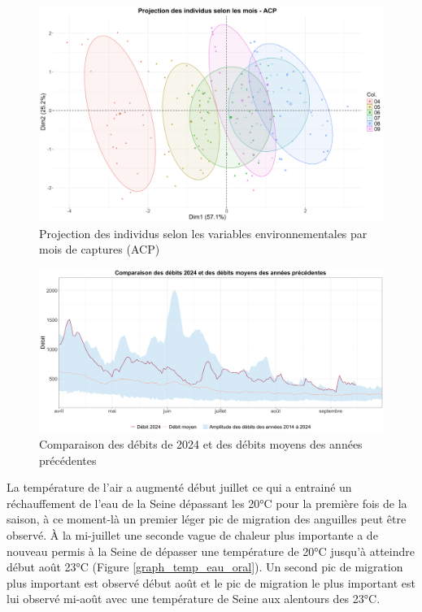 \documentclass[11pt,titlepage,twoside]{article}\usepackage[]{graphicx}\usepackage[table]{xcolor}
\begin{document}
\begin{figure}[htpb]
\centering
\includegraphics[width=\textwidth]{Individus.png}
\caption{Projection des individus selon les variables environnementales par mois de captures (ACP)}
\label{Individus}
\end{figure} 

\begin{figure}[htpb]
\centering
\includegraphics[width=\textwidth]{graph_debit_oral.png}
\caption{Comparaison des débits de 2024 et des débits moyens des années précédentes}
\label{graph_debit_oral}
\end{figure} 

La température de l’air a augmenté début juillet ce qui a entrainé un réchauffement de l’eau de la Seine dépassant les 20°C pour la première fois de la saison, à ce moment-là un premier léger pic de migration des anguilles peut être observé. À la mi-juillet une seconde vague de chaleur plus importante a de nouveau permis à la Seine de dépasser une température de 20°C jusqu’à atteindre début août 23°C (Figure \ref{graph_temp_eau_oral}). Un second pic de migration plus important est observé début août et le pic de migration le plus important est lui observé mi-août avec une température de Seine aux alentours des 23°C.
\end{document}
